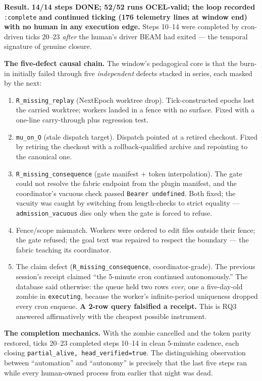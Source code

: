 \documentclass[11pt,a4paper]{article}
\theoremstyle{remark}
\newcommand{\term}[1]{\texttt{#1}}
\begin{document}
\textbf{Result.} \textbf{14/14 steps DONE; 52/52 runs OCEL-valid; the loop recorded} \term{:complete} \textbf{and continued ticking (176 telemetry lines at window end) with no human in any execution edge.} Steps 10--14 were completed by cron-driven ticks 20--23 \emph{after} the human's driver BEAM had exited --- the temporal signature of genuine closure.

\textbf{The five-defect causal chain.} The window's pedagogical core is that the burn-in initially failed through five \emph{independent} defects stacked in series, each masked by the next:
\begin{enumerate}
\item \term{R\_missing\_replay} (NextEpoch worktree drop). Tick-constructed epochs lost the carried worktree; workers landed in a fence with no surface. Fixed with a one-line carry-through plus regression test.
\item \term{mu\_on\_O} (stale dispatch target). Dispatch pointed at a retired checkout. Fixed by retiring the checkout with a rollback-qualified archive and repointing to the canonical one.
\item \term{R\_missing\_consequence} (gate manifest + token interpolation). The gate could not resolve the fabric endpoint from the plugin manifest, and the coordinator's vacuous check passed \term{Bearer undefined}. Both fixed; the vacuity was caught by switching from length-checks to strict equality --- \term{admission\_vacuous} dies only when the gate is forced to refuse.
\item Fence/scope mismatch. Workers were ordered to edit files outside their fence; the gate refused; the goal text was repaired to respect the boundary --- the fabric teaching its coordinator.
\item The claim defect (\term{R\_missing\_consequence}, coordinator-grade). The previous session's receipt claimed ``the 5-minute cron continued autonomously.'' The database said otherwise: the queue held two rows \emph{ever}, one a five-day-old zombie in \term{executing}, because the worker's infinite-period uniqueness dropped every cron enqueue. \textbf{A 2-row query falsified a receipt.} This is RQ3 answered affirmatively with the cheapest possible instrument.
\end{enumerate}

\textbf{The completion mechanics.} With the zombie cancelled and the token parity restored, ticks 20--23 completed steps 10--14 in clean 5-minute cadence, each closing \term{partial\_alive, head\_verified=true}. The distinguishing observation between ``automation'' and ``autonomy'' is precisely that the last five steps ran while every human-owned process from earlier that night was dead.
\end{document}

